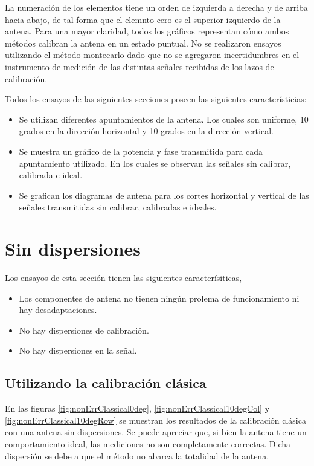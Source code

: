 La numeración de los elementos tiene un orden de izquierda a derecha y de arriba hacia abajo, de tal forma que el elemnto cero 
es el superior izquierdo de la antena.
Para una mayor claridad, todos los gráficos representan cómo ambos métodos calibran la antena en un estado puntual. No se 
realizaron ensayos utilizando el método montecarlo dado que no se agregaron incertidumbres en el instrumento de medición de las 
distintas señales recibidas de los lazos de calibración.

Todos los ensayos de las siguientes secciones poseen las siguientes característicias:
\begin{itemize}
	\item Se utilizan diferentes apuntamientos de la antena. Los cuales son uniforme, 10 grados en la dirección horizontal y 10 
		grados en la dirección vertical.
	\item Se muestra un gráfico de la potencia y fase transmitida para cada apuntamiento utilizado. En los cuales se observan las
		señales sin calibrar, calibrada e ideal. 
	\item Se grafican los diagramas de antena para los cortes horizontal y vertical de las señales transmitidas sin calibrar, 
		calibradas e ideales.
\end{itemize}


\section{Sin dispersiones}

Los ensayos de esta sección tienen las siguientes caracterísiticas,
\begin{itemize}
	\item Los componentes de antena no tienen ningún prolema de funcionamiento ni hay desadaptaciones.
	\item No hay dispersiones de calibración.
	\item No hay dispersiones en la señal.
\end{itemize}

\subsection{Utilizando la calibración clásica}

En las figuras \ref{fig:nonErrClassical0deg}, \ref{fig:nonErrClassical10degCol} y \ref{fig:nonErrClassical10degRow} se muestran
los resultados de la calibración clásica con una antena sin dispersiones. Se puede apreciar que, si bien la antena tiene un 
comportamiento ideal, las mediciones no son completamente correctas. Dicha dispersión se debe a que el método no abarca la 
totalidad de la antena.


